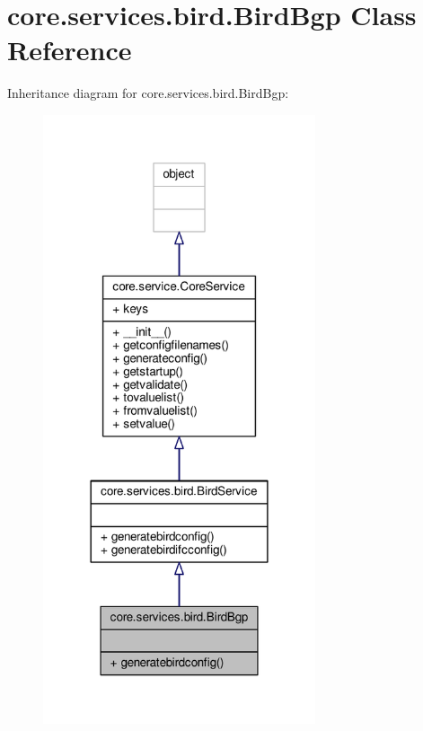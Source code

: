 \hypertarget{classcore_1_1services_1_1bird_1_1_bird_bgp}{\section{core.\+services.\+bird.\+Bird\+Bgp Class Reference}
\label{classcore_1_1services_1_1bird_1_1_bird_bgp}
}


Inheritance diagram for core.\+services.\+bird.\+Bird\+Bgp\+:
\nopagebreak
\begin{figure}[H]
\begin{center}
\leavevmode
\includegraphics[width=227pt]{classcore_1_1services_1_1bird_1_1_bird_bgp__inherit__graph}
\end{center}
\end{figure}


